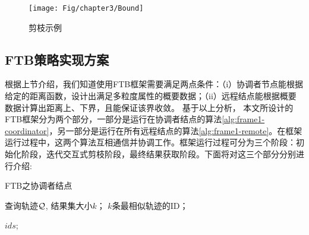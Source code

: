 \begin{figure}
	\centering
	\texttt{[image: Fig/chapter3/Bound]}
	\caption{剪枝示例}
	\label{fig-chapter3-Bound}
\end{figure}

\subsection{FTB策略实现方案}
根据上节介绍，我们知道使用FTB框架需要满足两点条件：（i）协调者节点能根据给定的距离函数，设计出满足多粒度属性的概要数据；（ii）远程结点能根据概要数据计算出距离上、下界，且能保证该界收敛。
基于以上分析，
本文所设计的FTB框架分为两个部分，一部分是运行在协调者结点的算法\ref{alg:frame1-coordinator}，另一部分是运行在所有远程结点的算法\ref{alg:frame1-remote}。在框架运行过程中，这两个算法互相通信并协调工作。框架运行过程可分为三个阶段：初始化阶段，迭代交互式剪枝阶段，最终结果获取阶段。下面将对这三个部分分别进行介绍:

\begin{algorithm}[t]
	\caption{FTB之协调者结点}
	\label{alg:frame1-coordinator}
	\begin{algorithmic}[1]
		\REQUIRE 查询轨迹${\cal Q}$, 结果集大小$k$；
		\ENSURE $k$条最相似轨迹的ID；
		
		\label{a1:info}
		\ENDIF
		\ENDWHILE
		\RETURN $ids$; \label{a1:finalreturn}
	\end{algorithmic}
\end{algorithm}


